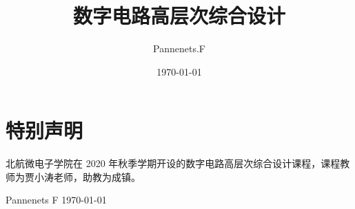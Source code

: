 \documentclass[cn,11pt,chinese,black,simple]{elegantbook}
\title{数字电路高层次综合设计}
\author{Pannenets.F}
\date{\today}
\begin{document}
\maketitle
\frontmatter

\chapter*{特别声明}

北航微电子学院在 2020 年秋季学期开设的数字电路高层次综合设计课程，课程教师为贾小涛老师，助教为成镇。

% 

\begin{flushright}
Pannenets F
\today
\end{flushright}

\tableofcontents

\mainmatter




\end{document}
